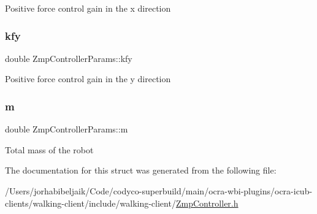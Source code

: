 Positive force control gain in the x direction \hypertarget{structZmpControllerParams_ab90ab2a81a4a9060e5afe9ee8d144e6a}{}\label{structZmpControllerParams_ab90ab2a81a4a9060e5afe9ee8d144e6a} 
\subsubsection{\texorpdfstring{kfy}{kfy}}
{\footnotesize\ttfamily double Zmp\+Controller\+Params\+::kfy}

Positive force control gain in the y direction \hypertarget{structZmpControllerParams_a09a7a86043a6b356478105f00ad84049}{}\label{structZmpControllerParams_a09a7a86043a6b356478105f00ad84049} 
\subsubsection{\texorpdfstring{m}{m}}
{\footnotesize\ttfamily double Zmp\+Controller\+Params\+::m}

Total mass of the robot 

The documentation for this struct was generated from the following file\+:\begin{DoxyCompactItemize}
\item 
/\+Users/jorhabibeljaik/\+Code/codyco-\/superbuild/main/ocra-\/wbi-\/plugins/ocra-\/icub-\/clients/walking-\/client/include/walking-\/client/\hyperlink{ZmpController_8h}{Zmp\+Controller.\+h}\end{DoxyCompactItemize}
